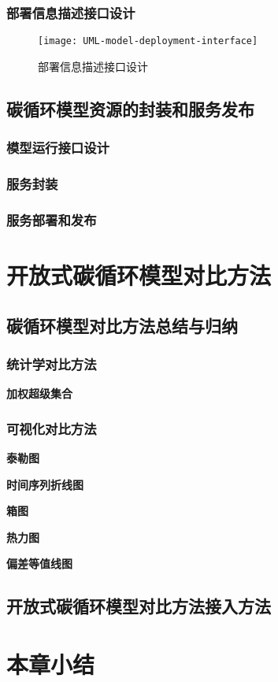 \subsubsection{部署信息描述接口设计}

\begin{figure}[!htbp]
    \centering
    \texttt{[image: UML-model-deployment-interface]}
    \caption{部署信息描述接口设计}
    \label{fig:UML-model-deployment-interface}
\end{figure}

\subsection{碳循环模型资源的封装和服务发布}
\subsubsection{模型运行接口设计}

\subsubsection{服务封装}

\subsubsection{服务部署和发布}


\section{开放式碳循环模型对比方法}

\subsection{碳循环模型对比方法总结与归纳}
\subsubsection{统计学对比方法}
\textbf{加权超级集合}

\subsubsection{可视化对比方法}
\textbf{泰勒图}

\textbf{时间序列折线图}

\textbf{箱图}

\textbf{热力图}

\textbf{偏差等值线图}

\subsection{开放式碳循环模型对比方法接入方法}

\section{本章小结}

